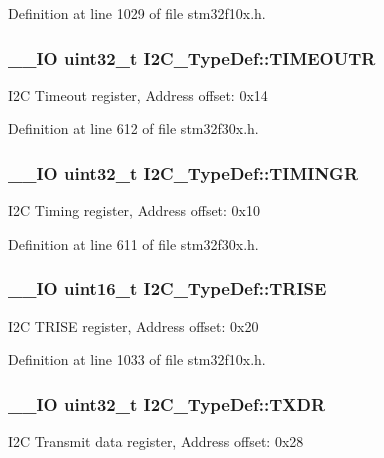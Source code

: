 Definition at line 1029 of file stm32f10x.\-h.

\hypertarget{struct_i2_c___type_def_a95f1607b6254092066a3b6e35146e28a}{
\subsubsection[{T\-I\-M\-E\-O\-U\-T\-R}]{\setlength{\rightskip}{0pt plus 5cm}\-\_\-\-\_\-\-I\-O {\bf uint32\-\_\-t} I2\-C\-\_\-\-Type\-Def\-::\-T\-I\-M\-E\-O\-U\-T\-R}}\label{struct_i2_c___type_def_a95f1607b6254092066a3b6e35146e28a}
I2\-C Timeout register, Address offset\-: 0x14 

Definition at line 612 of file stm32f30x.\-h.

\hypertarget{struct_i2_c___type_def_a92514ade6721d7c8e35d95c5b5810852}{
\subsubsection[{T\-I\-M\-I\-N\-G\-R}]{\setlength{\rightskip}{0pt plus 5cm}\-\_\-\-\_\-\-I\-O {\bf uint32\-\_\-t} I2\-C\-\_\-\-Type\-Def\-::\-T\-I\-M\-I\-N\-G\-R}}\label{struct_i2_c___type_def_a92514ade6721d7c8e35d95c5b5810852}
I2\-C Timing register, Address offset\-: 0x10 

Definition at line 611 of file stm32f30x.\-h.

\hypertarget{struct_i2_c___type_def_aaba7a808e4dfae5cc06b197c298af206}{
\subsubsection[{T\-R\-I\-S\-E}]{\setlength{\rightskip}{0pt plus 5cm}\-\_\-\-\_\-\-I\-O {\bf uint16\-\_\-t} I2\-C\-\_\-\-Type\-Def\-::\-T\-R\-I\-S\-E}}\label{struct_i2_c___type_def_aaba7a808e4dfae5cc06b197c298af206}
I2\-C T\-R\-I\-S\-E register, Address offset\-: 0x20 

Definition at line 1033 of file stm32f10x.\-h.

\hypertarget{struct_i2_c___type_def_ad243ba45c86b31cb271ccfc09c920628}{
\subsubsection[{T\-X\-D\-R}]{\setlength{\rightskip}{0pt plus 5cm}\-\_\-\-\_\-\-I\-O {\bf uint32\-\_\-t} I2\-C\-\_\-\-Type\-Def\-::\-T\-X\-D\-R}}\label{struct_i2_c___type_def_ad243ba45c86b31cb271ccfc09c920628}
I2\-C Transmit data register, Address offset\-: 0x28 

